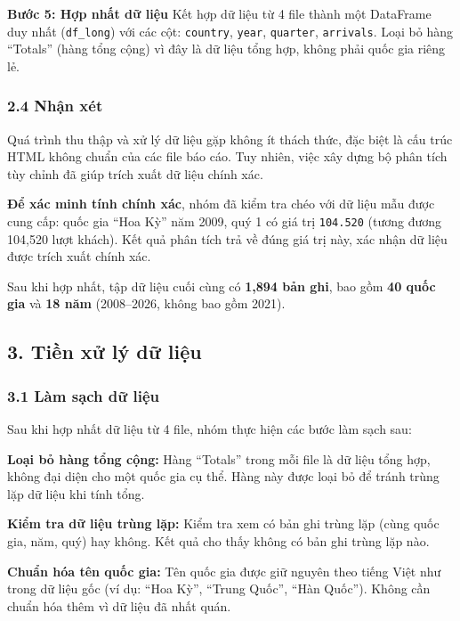 \documentclass[11pt]{article}
\begin{document}
\textbf{Bước 5: Hợp nhất dữ liệu} Kết hợp dữ liệu từ 4 file thành một
DataFrame duy nhất (\texttt{df\_long}) với các cột: \texttt{country},
\texttt{year}, \texttt{quarter}, \texttt{arrivals}. Loại bỏ hàng
``Totals'' (hàng tổng cộng) vì đây là dữ liệu tổng hợp, không phải quốc
gia riêng lẻ.

\subsubsection{2.4 Nhận xét}\label{nhux1eadn-xuxe9t}

Quá trình thu thập và xử lý dữ liệu gặp không ít thách thức, đặc biệt là
cấu trúc HTML không chuẩn của các file báo cáo. Tuy nhiên, việc xây dựng
bộ phân tích tùy chỉnh đã giúp trích xuất dữ liệu chính xác.

\textbf{Để xác minh tính chính xác}, nhóm đã kiểm tra chéo với dữ liệu
mẫu được cung cấp: quốc gia ``Hoa Kỳ'' năm 2009, quý 1 có giá trị
\texttt{104.520} (tương đương 104,520 lượt khách). Kết quả phân tích trả
về đúng giá trị này, xác nhận dữ liệu được trích xuất chính xác.

Sau khi hợp nhất, tập dữ liệu cuối cùng có \textbf{1,894 bản ghi}, bao
gồm \textbf{40 quốc gia} và \textbf{18 năm} (2008--2026, không bao gồm
2021).

    \subsection{3. Tiền xử lý dữ
liệu}\label{tiux1ec1n-xux1eed-luxfd-dux1eef-liux1ec7u}

\subsubsection{3.1 Làm sạch dữ
liệu}\label{luxe0m-sux1ea1ch-dux1eef-liux1ec7u}

Sau khi hợp nhất dữ liệu từ 4 file, nhóm thực hiện các bước làm sạch
sau:

\textbf{Loại bỏ hàng tổng cộng:} Hàng ``Totals'' trong mỗi file là dữ
liệu tổng hợp, không đại diện cho một quốc gia cụ thể. Hàng này được
loại bỏ để tránh trùng lặp dữ liệu khi tính tổng.

\textbf{Kiểm tra dữ liệu trùng lặp:} Kiểm tra xem có bản ghi trùng lặp
(cùng quốc gia, năm, quý) hay không. Kết quả cho thấy không có bản ghi
trùng lặp nào.

\textbf{Chuẩn hóa tên quốc gia:} Tên quốc gia được giữ nguyên theo tiếng
Việt như trong dữ liệu gốc (ví dụ: ``Hoa Kỳ'', ``Trung Quốc'', ``Hàn
Quốc''). Không cần chuẩn hóa thêm vì dữ liệu đã nhất quán.
\end{document}
